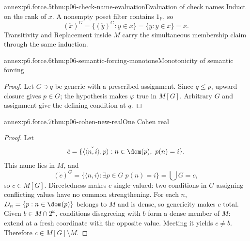 \begin{annexitem}{annex:p6.force.5}{thm:p06-check-name-evaluation}{Evaluation of check names}
Induct on the rank of \(x\).  A nonempty poset filter contains
\(1_{\mathbb P}\), so
\[
  (\check x)^G
  =\{(\check y)^G:y\in x\}
  =\{y:y\in x\}=x.
\]
Transitivity and Replacement inside \(M\) carry the simultaneous membership
claim through the same induction.
\end{annexitem}

\begin{annexitem}{annex:p6.force.6}{thm:p06-semantic-forcing-monotone}{Monotonicity of semantic forcing}
\begin{proof}
Let \(G\ni q\) be generic with a prescribed assignment.  Since \(q\leq p\),
upward closure gives \(p\in G\); the hypothesis makes \(\varphi\) true in
\(M[G]\).  Arbitrary \(G\) and assignment give the defining condition at \(q\).
\end{proof}
\end{annexitem}

\begin{annexitem}{annex:p6.force.7}{thm:p06-cohen-new-real}{One Cohen real}
\begin{proof}
Let
\[
  \dot c=\{\langle\check{\langle n,i\rangle},p\rangle:
    n\in\dom(p),\ p(n)=i\}.
\]
This name lies in \(M\), and
\[
  (\dot c)^G
  =\{\langle n,i\rangle:\exists p\in G\;p(n)=i\}
  =\bigcup G=c,
\]
so \(c\in M[G]\).  Directedness makes \(c\) single-valued: two conditions in
\(G\) assigning conflicting values have no common strengthening.  For each \(n\),
\(D_n=\{p:n\in\dom(p)\}\) belongs to \(M\) and is dense, so genericity makes
\(c\) total.  Given \(b\in M\cap2^\omega\), conditions disagreeing with \(b\)
form a dense member of \(M\): extend at a fresh coordinate with the opposite
value.  Meeting it yields \(c\neq b\).  Therefore \(c\in M[G]\setminus M\).
\end{proof}
\end{annexitem}

